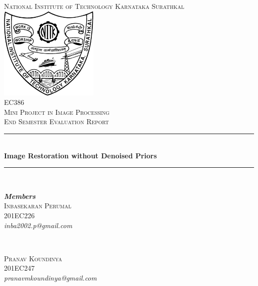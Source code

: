\documentclass[journal]{IEEEtran} %
\begin{document}
\begin{titlepage}

\newcommand{\HRule}{\rule{\linewidth}{0.5mm}} %

\center 
 

\textsc{\LARGE National Institute of Technology Karnataka Surathkal}\\[2cm] 

\includegraphics[width=180px, keepaspectratio]{NITK_Emblem.png}\\[1.5cm] 


\textsc{\huge EC386 }\\[.4 cm]
\textsc{\LARGE Mini Project in Image Processing }\\[.75 cm]
\textsc{\Large End Semester Evaluation Report}\\[.75cm]
\HRule \\[0.4cm]
{ \huge \bfseries Image Restoration without Denoised Priors}\\[0.4cm] %
\HRule \\[1.5cm]
 

\begin{minipage}{0.4\textwidth}
\begin{flushleft} \large
    \emph{\textbf{Members}}\\
    \textsc{Inbasekaran Perumal} \\
    \textsc{201EC226} \\
    \emph{inba2002.p@gmail.com} \\
   
\end{flushleft}
\end{minipage}
~
\begin{minipage}{0.4\textwidth}
\begin{flushright} \large
    \hfill \break
    \hfill \break
    \textsc{Pranav Koundinya} \\
    \textsc{201EC247} \\
    \emph{pranavmkoundinya@gmail.com} \\
\end{flushright}
\end{minipage}\\[1.3cm]


\end{titlepage}
\end{document}
